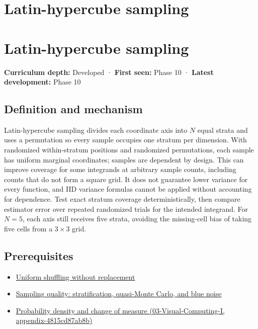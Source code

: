 \hypertarget{appendix-1c5e85693a06}{}
\section*{Latin-hypercube sampling}
\section{Latin-hypercube sampling}\label{appendix-1c5e85693a06-latin-hypercube-sampling}

\textbf{Curriculum depth:} Developed · \textbf{First seen:} Phase 10 · \textbf{Latest development:} Phase 10

\subsection{Definition and mechanism}\label{appendix-1c5e85693a06-definition-and-mechanism}

Latin-hypercube sampling divides each coordinate axis into \(N\) equal strata and uses a permutation so every sample occupies one stratum per dimension. With randomized within-stratum positions and randomized permutations, each sample has uniform marginal coordinates; samples are dependent by design. This can improve coverage for some integrands at arbitrary sample counts, including counts that do not form a square grid. It does not guarantee lower variance for every function, and IID variance formulas cannot be applied without accounting for dependence. Test exact stratum coverage deterministically, then compare estimator error over repeated randomized trials for the intended integrand. For \(N=5\), each axis still receives five strata, avoiding the missing-cell bias of taking five cells from a \(3\times3\) grid.

\subsection{Prerequisites}\label{appendix-1c5e85693a06-prerequisites}

\begin{itemize}
\tightlist
\item
  \hyperref[appendix-184fcc411663]{Uniform shuffling without replacement}
\item
  \hyperref[appendix-9f693ffd82bc]{Sampling quality: stratification, quasi-Monte Carlo, and blue noise}
\item
  \href{../03-Visual-Computing-I/main.pdf\#nameddest=appendix-4815cd87ab8b}{Probability density and change of measure (03-Visual-Computing-I, appendix-4815cd87ab8b)}
\end{itemize}

